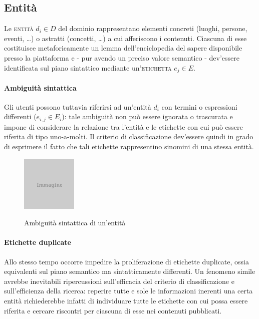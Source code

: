 \subsection{Entità}  
Le \textsc{entità} $d_i \in D$ del dominio rappresentano elementi concreti (luoghi, persone, eventi, \ldots) o astratti (concetti, \ldots) a cui afferiscono i contenuti. Ciascuna di esse costituisce metaforicamente un lemma dell'enciclopedia del sapere disponibile presso la piattaforma e - pur avendo un preciso valore semantico - dev'essere identificata sul piano sintattico mediante un'\textsc{etichetta} $e_j \in E$.


\paragraph{Ambiguità sintattica}
Gli utenti possono tuttavia riferirsi ad un'entità $d_i$ con termini o espressioni differenti ($e_{i,j} \in E_i$): tale ambiguità non può essere ignorata o trascurata e impone di considerare la relazione tra l'entità e le etichette con cui può essere riferita di tipo uno-a-molti. Il criterio di classificazione dev'essere quindi in grado di esprimere il fatto che tali etichette rappresentino sinomini di una stessa entità.

\begin{figure}[ht]
\begin{center}
\includegraphics{placeholder.png}
\label{fig:tesi:stage:fase-uno:ambiguita-sintattica-entita}
\caption{Ambiguità sintattica di un'entità}
\end{center}
\end{figure}

\paragraph{Etichette duplicate}
Allo stesso tempo occorre impedire la proliferazione di etichette duplicate, ossia equivalenti sul piano semantico ma sintatticamente differenti. Un fenomeno simile avrebbe inevitabili ripercussioni sull'efficacia del criterio di classificazione e sull'efficienza della ricerca: reperire tutte e sole le informazioni inerenti una certa entità richiederebbe infatti di individuare tutte le etichette con cui possa essere riferita e cercare riscontri per ciascuna di esse nei contenuti pubblicati.


